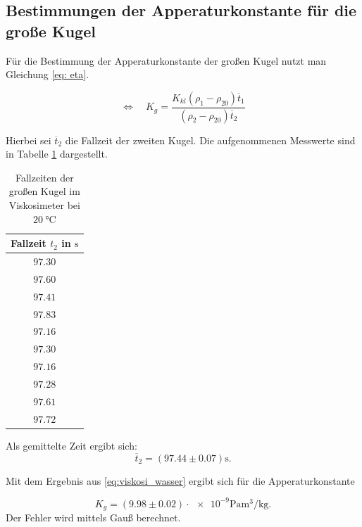 \subsection{Bestimmungen der Apperaturkonstante für die große Kugel}
Für die Bestimmung der Apperaturkonstante der großen Kugel nutzt man Gleichung \eqref{eq: eta}.

\begin{equation*}
\Leftrightarrow \quad K_{g}=\frac{K_{kl}\left(\rho_1-\rho_{20}\right)\overline{t}_1}{\left(\rho_2-\rho_{20}\right)\overline{t}_2}
\end{equation*}

Hierbei sei $\overline{t}_2$ die Fallzeit der zweiten Kugel.
Die aufgenommenen Messwerte sind in Tabelle \ref{tab:messwerte_fallzeit_kugel_gross} dargestellt.

\begin{table}
\centering
\begin{tabular} {c}
  \toprule
  Fallzeit $t_2$ in $\si{\second}$ \\
  \midrule
  $\num{97.30}$ \\
  $\num{97.60}$ \\
  $\num{97.41}$ \\
  $\num{97.83}$ \\
  $\num{97.16}$ \\
  $\num{97.30}$ \\
  $\num{97.16}$ \\
  $\num{97.28}$ \\
  $\num{97.61}$ \\
  $\num{97.72}$ \\
\bottomrule
\end{tabular}
\caption{Fallzeiten der großen Kugel im Viskosimeter bei $\SI{20}{\degreeCelsius}$}
\label{tab:messwerte_fallzeit_kugel_gross}
\end{table}

Als gemittelte Zeit ergibt sich:
\begin{equation}
\label{eq:gemittelte_fallzeit_gross}
\overline{t}_{2}=\left(\num{97.44}\pm\num{0.07}\right) \si{\second}.
\end{equation}

Mit dem Ergebnis aus \eqref{eq:viskosi_wasser} ergibt sich für die
Apperaturkonstante

\begin{equation}
\label{eq:app_konst_gross}
K_{g}=\left(\num{9.98}\pm\num{0.02}\right)\cdot{\num{e-9}} \si{\pascal\cubic\meter\per\kilogram}.
\end{equation}
Der Fehler wird mittels Gauß berechnet.

